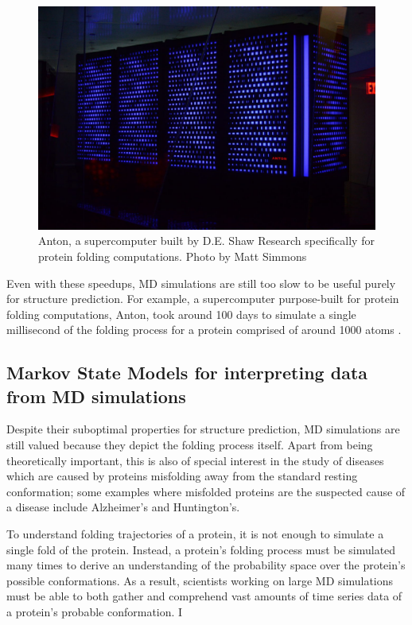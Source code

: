 \documentclass{article}
\begin{document}
\begin{figure}[ht]
  \includegraphics[width=\linewidth]{images/anton.jpg}
  \caption{Anton, a supercomputer built by D.E. Shaw Research specifically for protein folding computations. \cite{Anton} Photo by Matt Simmons}
  \label{fig:anton}
\end{figure}

Even with these speedups, MD simulations are still too slow to be useful purely for structure prediction. For example, a supercomputer purpose-built for protein folding computations, Anton, took around 100 days to simulate a single millisecond of the folding process for a protein comprised of around 1000 atoms \cite{Anton}.

\subsection{Markov State Models for interpreting data from MD simulations}
Despite their suboptimal properties for structure prediction, MD simulations are still valued because they depict the folding process itself. Apart from being theoretically important, this is also of special interest in the study of diseases which are caused by proteins misfolding away from the standard resting conformation; some examples where misfolded proteins are the suspected cause of a disease include Alzheimer's and Huntington's.

To understand folding trajectories of a protein, it is not enough to simulate a single fold of the protein. Instead, a protein's folding process must be simulated many times to derive an understanding of the probability space over the protein's possible conformations. As a result, scientists working on large MD simulations must be able to both gather and comprehend vast amounts of time series data of a protein's probable conformation. I
\end{document}
